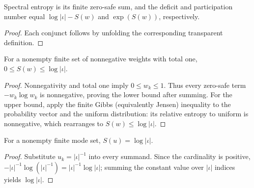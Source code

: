 \begin{theorem}
\label{thm:thermal:entropy-diagnostics-spec}
Spectral entropy is its finite zero-safe sum, and the deficit and participation
number equal $\log|\iota|-S(w)$ and $\exp(S(w))$, respectively.
\end{theorem}
\begin{proof}

\leanok
Each conjunct follows by unfolding the corresponding transparent definition.
\end{proof}

\begin{theorem}
\label{thm:thermal:spectral-entropy-bounds}
For a nonempty finite set of nonnegative weights with total one,
$0\leq S(w)\leq\log|\iota|$.
\end{theorem}
\begin{proof}

\leanok
Nonnegativity and total one imply $0\leq w_k\leq1$.  Thus every zero-safe
term $-w_k\log w_k$ is nonnegative, proving the lower bound after summing.
For the upper bound, apply the finite Gibbs (equivalently Jensen) inequality
to the probability vector and the uniform distribution: its relative entropy
to uniform is nonnegative, which rearranges to $S(w)\leq\log|\iota|$.
\end{proof}

\begin{theorem}
\label{thm:thermal:spectral-entropy-uniform}
For a nonempty finite mode set, $S(u)=\log|\iota|$.
\end{theorem}
\begin{proof}

\leanok
Substitute $u_k=|\iota|^{-1}$ into every summand.  Since the cardinality is
positive, $- |\iota|^{-1}\log(|\iota|^{-1})=|\iota|^{-1}\log|\iota|$;
summing the constant value over $|\iota|$ indices yields $\log|\iota|$.
\end{proof}
